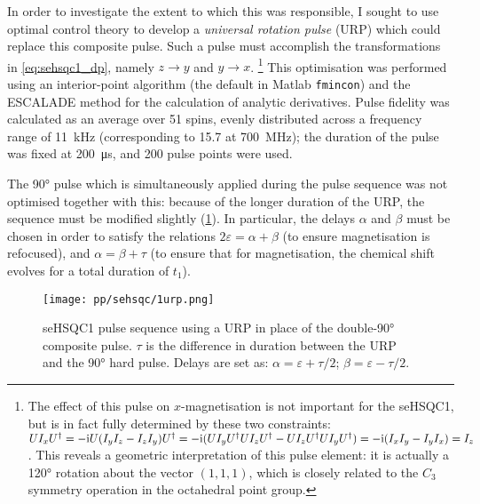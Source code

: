 In order to investigate the extent to which this was responsible, I sought to use optimal control theory to develop a \textit{universal rotation pulse} (URP) which could replace this composite pulse.
Such a pulse must accomplish the transformations in \cref{eq:sehsqc1_dp}, namely $z \to y$ and $y \to x$.%
\footnote{The effect of this pulse on $x$-magnetisation is not important for the seHSQC1, but is in fact fully determined by these two constraints: $UI_xU^\dagger = -\mathrm{i} U(I_yI_z - I_zI_y)U^\dagger = -\mathrm{i}(UI_yU^\dagger UI_zU^\dagger - UI_zU^\dagger UI_yU^\dagger) = -\mathrm{i}(I_xI_y - I_yI_x) = I_z$.
This reveals a geometric interpretation of this pulse element: it is actually a \ang{120} rotation about the vector $(1, 1, 1)$, which is closely related to the $C_3$ symmetry operation in the octahedral point group.}
This optimisation was performed using an interior-point algorithm (the default in Matlab \texttt{fmincon}) and the ESCALADE method\autocite{Foroozandeh2021A} for the calculation of analytic derivatives.
Pulse fidelity was calculated as an average over 51 \proton{} spins, evenly distributed across a frequency range of \qty{11}{kHz} (corresponding to \qty{15.7}{\ppm} at \qty{700}{\MHz}); the duration of the pulse was fixed at \qty{200}{\us}, and 200 pulse points were used.

The \carbon{} \ang{90} pulse which is simultaneously applied during the pulse sequence was not optimised together with this: because of the longer duration of the \proton{} URP, the sequence must be modified slightly (\cref{fig:sehsqc1_urp}).
In particular, the delays $\alpha$ and $\beta$ must be chosen in order to satisfy the relations $2\varepsilon = \alpha + \beta$ (to ensure  magnetisation is refocused), and $\alpha = \beta + \tau$ (to ensure that for  magnetisation, the \carbon{} chemical shift evolves for a total duration of $t_1$).

\begin{figure}[!ht]
    \centering
    \texttt{[image: pp/sehsqc/1urp.png]}%
    \caption[seHSQC1 pulse sequence with \proton{} URP]{
        seHSQC1 pulse sequence using a \proton{} URP in place of the double-\ang{90} composite pulse.
        $\tau$ is the difference in duration between the URP and the \carbon{} \ang{90} hard pulse.
        Delays are set as: $\alpha = \varepsilon + \tau/2$; $\beta = \varepsilon - \tau/2$.
    }
    \label{fig:sehsqc1_urp}
\end{figure}

